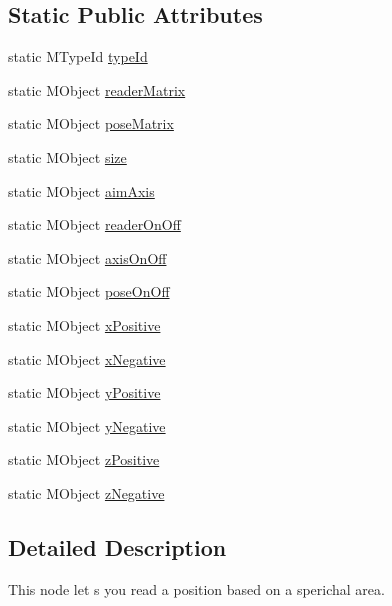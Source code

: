 \subsection*{Static Public Attributes}
\begin{DoxyCompactItemize}
\item 
static M\-Type\-Id \hyperlink{class_m_g__pose_reader_a0377069c7c81064a0102b87b43f17de7}{type\-Id}
\item 
static M\-Object \hyperlink{class_m_g__pose_reader_a8d13cb5a9150c21108b530211b1a5693}{reader\-Matrix}
\item 
static M\-Object \hyperlink{class_m_g__pose_reader_a37357d03b4a67aecbe5b3a7e3779cac7}{pose\-Matrix}
\item 
static M\-Object \hyperlink{class_m_g__pose_reader_a452750f9ea6f7d58cdd582666caf93aa}{size}
\item 
static M\-Object \hyperlink{class_m_g__pose_reader_ac0827c80b838e3536fea477045a4903d}{aim\-Axis}
\item 
static M\-Object \hyperlink{class_m_g__pose_reader_a431fdcb6a8e76c2963660dc58b7832c0}{reader\-On\-Off}
\item 
static M\-Object \hyperlink{class_m_g__pose_reader_a87e5e32106ddc45fbd15390698f1cbef}{axis\-On\-Off}
\item 
static M\-Object \hyperlink{class_m_g__pose_reader_a94faeca46f1634cb4634df288acad4f2}{pose\-On\-Off}
\item 
static M\-Object \hyperlink{class_m_g__pose_reader_a575eb3243593993d47794ede7e56a19a}{x\-Positive}
\item 
static M\-Object \hyperlink{class_m_g__pose_reader_a70a536b55c374d6fa3ee29da2d07e416}{x\-Negative}
\item 
static M\-Object \hyperlink{class_m_g__pose_reader_ad9eddeafae27cd633b869c5fc9dc4513}{y\-Positive}
\item 
static M\-Object \hyperlink{class_m_g__pose_reader_af45e2be7873bbfd49425fb622beae3d3}{y\-Negative}
\item 
static M\-Object \hyperlink{class_m_g__pose_reader_aef81fc58368214f0e34421990e6b53f8}{z\-Positive}
\item 
static M\-Object \hyperlink{class_m_g__pose_reader_aff4a284d37e399e1b3a8d1dbea31c3bc}{z\-Negative}
\end{DoxyCompactItemize}


\subsection{Detailed Description}
This node let s you read a position based on a sperichal area. 

